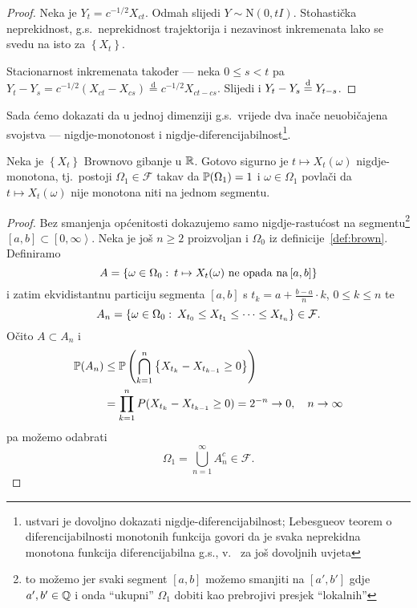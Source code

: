 \documentclass[main.tex]{subfiles}
\begin{document}
\begin{proof}
	Neka je \( Y_t = c^{-1/2}X_{ct} \). Odmah slijedi \( Y \sim \mathrm N(0, tI) \). Stohastička neprekidnost, g.s.\ neprekidnost trajektorija i nezavinost
	inkremenata lako se svedu na isto za \( \left\{ X_t \right\} \).

	Stacionarnost inkremenata također --- neka \( 0 \le s < t \) pa \( Y_t - Y_s = c^{-1/2}\left( X_{ct} - X_{cs} \right) \overset{\mathrm d}{=} c^{-1/2}X_{ct-cs} \).
	Slijedi i  \( Y_t-Y_s \jpod Y_{t-s} \).
\end{proof}

Sada ćemo dokazati da u jednoj dimenziji g.s.\ vrijede dva inače neuobičajena svojstva --- nigdje-monotonost i nigdje-diferencijabilnost\footnote{ustvari je dovoljno dokazati nigdje-diferencijabilnost;
	Lebesgueov teorem o diferencijabilnosti monotonih funkcija govori da je svaka neprekidna monotona funkcija diferencijabilna g.s., v.~\cite[remark 5.10]{sato} za još dovoljnih uvjeta}.

\begin{teorem} \label{tm:brown-nemonotonost}
	Neka je \( \left\{ X_t \right\} \) Brownovo gibanje u \( \R \). Gotovo sigurno je \( t \mapsto X_t(\omega) \) nigdje-monotona, tj.\
	postoji \( \Omega_1 \in \mathcal F \) takav da \( \P(\Omega_1)=1 \) i \( \omega \in \Omega_1 \) povlači da \( t \mapsto X_t(\omega) \)
	nije monotona niti na jednom segmentu.
\end{teorem}

\begin{proof}
	Bez smanjenja općenitosti dokazujemo samo nigdje-rastućost na segmentu\footnote{to možemo jer svaki segment \( \left[ a,b \right] \) možemo smanjiti na \( \left[ a',b' \right] \) gdje \( a',b'\in\Q \) i onda \enquote{ukupni} \( \Omega_1 \) dobiti kao prebrojivi presjek \enquote{lokalnih}} \( \left[ a,b \right] \subset \left[ 0,\infty \right\rangle \). Neka je još \( n \ge 2 \) proizvoljan i \( \Omega_0 \) iz definicije~\ref{def:brown}.
	Definiramo
	\begin{equation}
		A = \left\{ \omega \in \Omega_0 \st t \mapsto X_t(\omega) \mathrm{\ ne \ opada \ na } \left[ a,b \right] \right\}
	\end{equation}
	i zatim ekvidistantnu particiju segmenta \( \left[ a,b \right] \) s \( t_k = a + \frac{b-a}n \cdot k \), \( 0 \le k \le n  \) te
	\begin{equation}
		A_n = \left\{ \omega \in \Omega_0 \st X_{t_0} \le X_{t_1} \le \cdots \le X_{t_n} \right\} \in \mathcal F.
	\end{equation}
	Očito \( A \subset A_n \) i
	\begin{align}
		\P(A_n) & \le \P\left(\bigcap_{k=1}^n \left\{ X_{t_k} - X_{t_{k-1}} \ge 0  \right\} \right) \\
		        & = \prod_{k=1}^n P(X_{t_k} - X_{t_{k-1}} \ge 0) = 2^{-n} \un, \quad n \ub
	\end{align}
	pa možemo odabrati
	\[
		\Omega_1 = \bigcup_{n=1}^\infty A_n^c \in \mathcal F.
	\]
\end{proof}
\end{document}
